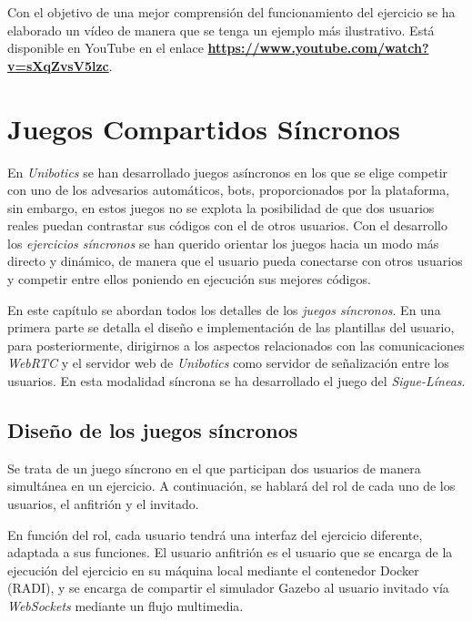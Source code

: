 \documentclass[a4paper, 12pt]{book}
\begin{document}
Con el objetivo de una mejor comprensión del funcionamiento del ejercicio se ha elaborado un vídeo de manera que se tenga un ejemplo más ilustrativo. Está disponible en YouTube en el enlace \textbf{\url{https://www.youtube.com/watch?v=sXqZvsV5lzc}}.


\cleardoublepage
\chapter{Juegos Compartidos Síncronos}

En \emph{Unibotics} se han desarrollado juegos asíncronos en los que se elige competir con uno de los advesarios automáticos, bots, proporcionados por la plataforma, sin embargo, en estos juegos no se explota la posibilidad de que dos usuarios reales puedan contrastar sus códigos con el de otros usuarios. Con el desarrollo los \emph{ejercicios síncronos} se han querido orientar los juegos hacia un modo más directo y dinámico, de manera que el usuario pueda conectarse con otros usuarios y competir entre ellos poniendo en ejecución sus mejores códigos.

En este capítulo se abordan todos los detalles de los \emph{juegos síncronos}. En una primera parte se detalla el diseño e implementación de las plantillas del usuario, para posteriormente, dirigirnos a los aspectos relacionados con las comunicaciones \emph{WebRTC} y el servidor web de \emph{Unibotics} como servidor de señalización entre los usuarios. En esta modalidad síncrona se ha desarrollado el juego del \emph{Sigue-Líneas}.

\section{Diseño de los juegos síncronos}
\label{sync_design}

Se trata de un juego síncrono en el que participan dos usuarios de manera simultánea en un ejercicio. A continuación, se hablará del rol de cada uno de los usuarios, el anfitrión y el invitado.

En función del rol, cada usuario tendrá una interfaz del ejercicio diferente, adaptada a sus funciones. El usuario anfitrión es el usuario que se encarga de la ejecución del ejercicio en su máquina local mediante el contenedor Docker (RADI), y se encarga de compartir el simulador Gazebo al usuario invitado vía \emph{WebSockets} mediante un flujo multimedia. 
\end{document}
